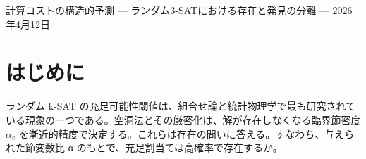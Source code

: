 \documentclass[12pt,a4paper]{article}
\begin{document}
\PaperTitleBlock
  {計算コストの構造的予測}
  {— ランダム3-SATにおける存在と発見の分離 —}
  {2026年4月12日}

\begin{abstract}
解が存在するかどうかと、アルゴリズムがそれを発見できるかどうかは、異なる機構に支配される別の問いである。ランダム 3-SAT では、第一モーメント法により

\[
E[\#\text{SAT}] = N_{\text{eff}} \cdot e^{-L}
\]

が成り立つ。ここで \(L = \alpha\) n\textbar ln(7/8)\textbar{} は節密度の再パラメータ化であり、第一モーメント法の指数そのものである。これは解の存在を特徴づけるが、発見については何も言わない。

本稿では計算予算 μ（ソルバーの操作回数）を導入し、条件つき成功確率 P(found\textbar SAT) が μ/μ\_c(L) の関数として乗法的に分離できるかを問う。3種のソルバー族（CDCL、WalkSAT、ランダム探索）を用い、\(n = 100-300\)変数、\(\alpha = 3.0-4.0\)の範囲で実験した結果、三つの知見を得る。

第一に、中央値実行時間は \(\mu_{c}\) ∝ e\^{}\{cL\} としてスケールし、感度指数 c はソルバーに依存する。CDCL では \(c ≈ 0.24\)、WalkSAT では \(c ≈ 0.21\)、ランダム探索では c = 1.0（厳密）である。

第二に、比 μ/μ\_c は有効な正規化変数であり、両ソルバーとも \(\mu/\mu_{c} = 1\)の付近で単調な遷移を示す。ただし遷移の形状は 14-15\% 異なる。

第三に、c の順序 \(c_{CDCL} > c_{WalkSAT}\)は、テストした全問題サイズ（\(n = 100-300\)）で頑健に成立する。

したがって、同一の構造的パラメータ L が存在（\(c = 1\)、数学的恒等式）と発見（\(c < 1\)、アルゴリズム依存）の双方を支配するが、感度は質的に異なる。とくに c は効率ではなく感度を測る量であり、WalkSAT は c が最小であるにもかかわらず絶対コストは最大である。これは、低感度が構造の活用ではなく構造の無視から生じうることを意味する。
\end{abstract}

\section{はじめに}\label{ux306fux3058ux3081ux306b}

ランダム k-SAT の充足可能性閾値は、組合せ論と統計物理学で最も研究されている現象の一つである。空洞法とその厳密化は、解が存在しなくなる臨界節密度 \(\alpha_{c}\) を漸近的精度で決定する。これらは存在の問いに答える。すなわち、与えられた節変数比 α のもとで、充足割当ては高確率で存在するか。
\end{document}
